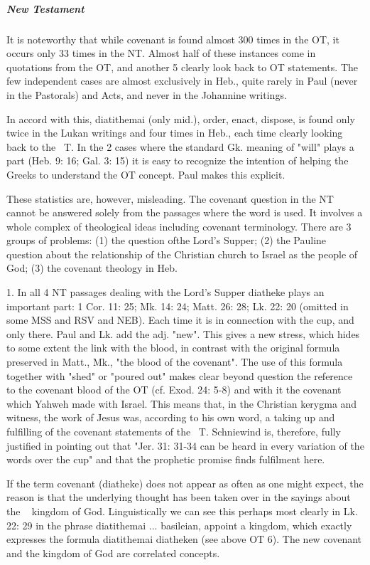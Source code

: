 			\subparagraph{New Testament}
			
				It is noteworthy that while covenant is found almost 300 times in the OT, it occurs only 33 times in the NT. Almost half of these instances come in quotations from the OT, and another 5 clearly look back to OT statements. The few independent cases are almost exclusively in Heb., quite rarely in Paul (never in the Pastorals) and Acts, and never in the Johannine writings. 

				In accord with this, diatithemai (only mid.), order, enact, dispose, is found only twice in the Lukan writings and four times in Heb., each time clearly looking back to the ~T. In the 2 cases where the standard Gk. meaning of "will" plays a part (Heb. 9: 16; Gal. 3: 15) it is easy to recognize the intention of helping the Greeks to understand the OT concept. Paul makes this explicit. 

				These statistics are, however, misleading. The covenant question in the NT cannot be answered solely from the passages where the word is used. It involves a whole complex of theological ideas including covenant terminology. There are 3 groups of problems: (1) the question ofthe Lord's Supper; (2) the Pauline question about the relationship of the Christian church to Israel as the people of God; (3) the covenant theology in Heb. 

				1. In all 4 NT passages dealing with the Lord's Supper diatheke plays an important part: 1 Cor. 11: 25; Mk. 14: 24; Matt. 26: 28; Lk. 22: 20 (omitted in some MSS and RSV and NEB). Each time it is in connection with the cup, and only there. Paul and Lk. add the adj. "new". This gives a new stress, which hides to some extent the link with the blood, in contrast with the original formula preserved in Matt., Mk., "the blood of the covenant". The use of this formula together with "shed" or "poured out" makes clear beyond question the reference to the covenant blood of the OT (cf. Exod. 24: 5-8) and with it the covenant which Yahweh made with Israel. This means that, in the Christian kerygma and witness, the work of Jesus was, according to his own word, a taking up and fulfilling of the covenant statements of the ~T. Schniewind is, therefore, fully justified in pointing out that "Jer. 31: 31-34 can be heard in every variation of the words over the cup" and that the prophetic promise finds fulfilment here. 

				If the term covenant (diatheke) does not appear as often as one might expect, the reason is that the underlying thought has been taken over in the sayings about the ~ kingdom of God. Linguistically we can see this perhaps most clearly in Lk. 22: 29 in the phrase diatithemai ... basileian, appoint a kingdom, which exactly expresses the formula diatithemai diatheken (see above OT 6). The new covenant and the kingdom of God are correlated concepts. 

